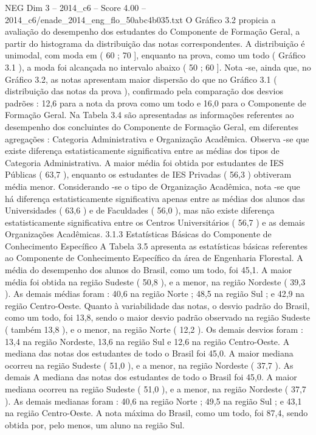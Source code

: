 \begin{textsample}{NEG Dim 3 – 2014\_c6 – Score 4.00 – 2014\_c6/enade\_2014\_eng\_flo\_50abc4b035.txt}
O Gráfico 3.2 propicia a avaliação do desempenho dos estudantes do Componente de Formação Geral, a partir do histograma da distribuição das notas correspondentes.
A distribuição é unimodal, com moda em ( 60 ; 70 ], enquanto na prova, como um todo ( Gráfico 3.1 ), a moda foi alcançada no intervalo abaixo ( 50 ; 60 ].
Nota -se, ainda que, no Gráfico 3.2, as notas apresentam maior dispersão do que no Gráfico 3.1 ( distribuição das notas da prova ), confirmado pela comparação dos desvios padrões : 12,6 para a nota da prova como um todo e 16,0 para o Componente de Formação Geral.
Na Tabela 3.4 são apresentadas as informações referentes ao desempenho dos concluintes do Componente de Formação Geral, em diferentes agregações : Categoria Administrativa e Organização Acadêmica.
Observa -se que existe diferença estatisticamente significativa entre as médias dos tipos de Categoria Administrativa.
A maior média foi obtida por estudantes de IES Públicas ( 63,7 ), enquanto os estudantes de IES Privadas ( 56,3 ) obtiveram média menor.
Considerando -se o tipo de Organização Acadêmica, nota -se que há diferença estatisticamente significativa apenas entre as médias dos alunos das Universidades ( 63,6 ) e de Faculdades ( 56,0 ), mas não existe diferença estatisticamente significativa entre os Centros Universitários ( 56,7 ) e as demais Organizações Acadêmicas. 3.1.3 Estatísticas Básicas do Componente de Conhecimento Específico A Tabela 3.5 apresenta as estatísticas básicas referentes ao Componente de Conhecimento Específico da área de Engenharia Florestal.
A média do desempenho dos alunos do Brasil, como um todo, foi 45,1.
A maior média foi obtida na região Sudeste ( 50,8 ), e a menor, na região Nordeste ( 39,3 ).
As demais médias foram : 40,6 na região Norte ; 48,5 na região Sul ; e 42,9 na região Centro-Oeste.
Quanto à variabilidade das notas, o desvio padrão do Brasil, como um todo, foi 13,8, sendo o maior desvio padrão observado na região Sudeste ( também 13,8 ), e o menor, na região Norte ( 12,2 ).
Os demais desvios foram : 13,4 na região Nordeste, 13,6 na região Sul e 12,6 na região Centro-Oeste.
A mediana das notas dos estudantes de todo o Brasil foi 45,0.
A maior mediana ocorreu na região Sudeste ( 51,0 ), e a menor, na região Nordeste ( 37,7 ).
As demais A mediana das notas dos estudantes de todo o Brasil foi 45,0.
A maior mediana ocorreu na região Sudeste ( 51,0 ), e a menor, na região Nordeste ( 37,7 ).
As demais medianas foram : 40,6 na região Norte ; 49,5 na região Sul ; e 43,1 na região Centro-Oeste.
A nota máxima do Brasil, como um todo, foi 87,4, sendo obtida por, pelo menos, um aluno na região Sul.

\end{textsample}
